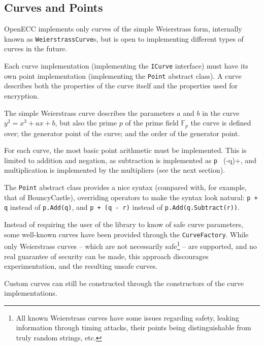\subsection{Curves and Points}
\label{sec:implementation_curves}

OpenECC implements only curves of the simple Weierstrass form, internally known as \verb+WeierstrassCurve+s,
but is open to implementing different types of curves in the future.

Each curve implementation (implementing the \verb+ICurve+ interface) must have its own point implementation
(implementing the \verb+Point+ abstract class). A curve describes both the properties of the curve itself and
the properties used for encryption.

The simple Weierstrass curve describes the parameters \(a\) and \(b\) in the curve \(y^2 = x^3 + ax + b\), but
also the prime \(p\) of the prime field \(\mathbb{F}_p\) the curve is defined over; the generator point of the
curve; and the order of the generator point.

For each curve, the most basic point arithmetic must be implemented. This is limited to addition and negation, as
subtraction is implemented as \verb+p + (-q)+, and multiplication is implemented by the multipliers (see the next
section).

The \verb+Point+ abstract class provides a nice syntax (compared with, for example, that of BouncyCastle), overriding
operators to make the syntax look natural: \verb|p + q| instead of \verb|p.Add(q)|, and \verb|p + (q - r)| instead of
\verb|p.Add(q.Subtract(r))|.

Instead of requiring the user of the library to know of safe curve parameters, some well-known curves have been
provided through the \verb|CurveFactory|. While only Weierstrass curves -- which are not necessarily
safe\footnote{All known Weierstrass curves have some issues regarding safety, leaking information through timing
attacks, their points being distinguishable from truly random strings, etc.\cite{safecurves}} -- are supported, and no real
guarantee of security can be made, this approach discourages experimentation, and the resulting unsafe curves.

Custom curves can still be constructed through the constructors of the curve implementations.

\begin{figure}
	
\end{figure}